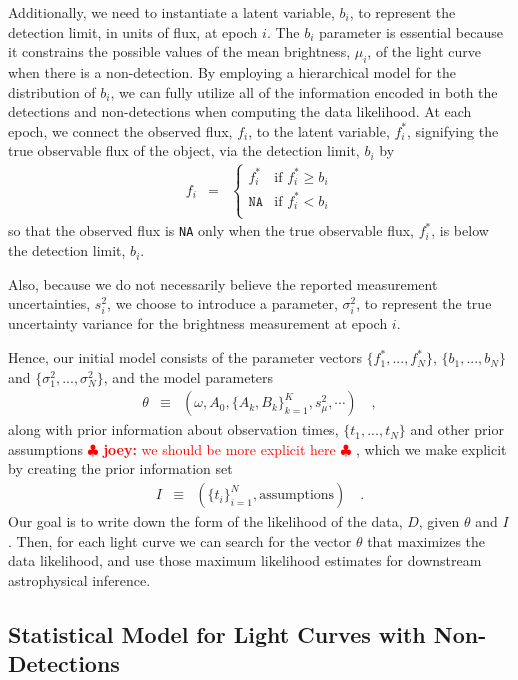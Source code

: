 \documentclass[12pt,preprint]{aastex}
\newcommand{\fobs}{f_i}
\newcommand{\sobs}{s^2_i}
\newcommand{\ftrue}{f_i^*}
\newcommand{\joey}[1] { \textcolor{red} {
\ensuremath{\clubsuit} {\bf joey:}  {#1}
\ensuremath{\clubsuit} } }%
\begin{document}
Additionally, we need to instantiate a latent variable, $b_i$, to represent the detection limit, in units of flux, at epoch $i$.  The $b_i$ parameter is essential because it constrains the possible values of the mean brightness, $\mu_i$, of the light curve when there is a non-detection.  By employing a hierarchical model for the distribution of $b_i$, we can fully utilize all of the information encoded in both the detections and non-detections when computing the data likelihood.   At each epoch, we connect the observed flux, $\fobs$, to the latent variable, $\ftrue$, signifying the true observable flux of the object, via the detection limit, $b_i$ by
\begin{eqnarray}\displaystyle
\fobs &=& \left\{\begin{array}{ll}
  \ftrue & \mbox{if $\ftrue \ge b_i$} \\
  \texttt{NA} & \mbox{if $\ftrue < b_i$} \\
\end{array} \right.
\end{eqnarray}
so that the observed flux is \texttt{NA} only when the true observable flux, $\ftrue$, is below the detection limit, $b_i$.


Also, because we do not necessarily believe the reported measurement uncertainties, $\sobs$, we choose to introduce a parameter, $\sigma^2_i$, to represent the true uncertainty variance for the brightness measurement at epoch $i$.

Hence, our initial model consists of the parameter vectors $\{f^*_1,...,f^*_N\}$, $\{b_1,...,b_N\}$ and $\{\sigma^2_1,...,\sigma^2_N\}$, and the model parameters
\begin{eqnarray}\displaystyle
\theta &\equiv& (\omega, A_0, \{A_k, B_k\}_{k=1}^K, s^2_\mu, \cdots) \quad ,
\end{eqnarray}
along with prior information about observation times, $\{t_1,...,t_N\}$ and other prior assumptions \joey{we should be more explicit here}, which we make explicit by creating the prior information set
\begin{eqnarray}\displaystyle
I &\equiv& (\{t_i\}_{i=1}^N, \mbox{assumptions}) \quad .
\end{eqnarray}
Our goal is to write down the form of the likelihood of the data, $D$, given $\theta$ and $I$.  Then, for each light curve we can search for the vector $\theta$ that maximizes the data likelihood, and use those maximum likelihood estimates for downstream astrophysical inference.


\subsection{Statistical Model for Light Curves with Non-Detections}
\end{document}
